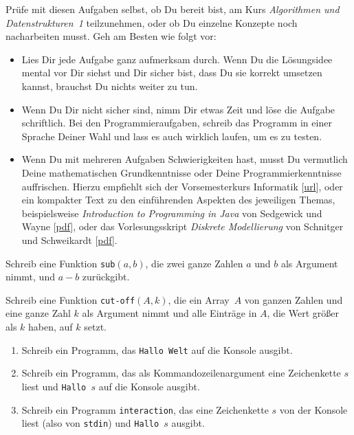 \documentclass{uebung_cs}
\begin{document}
Prüfe mit diesen Aufgaben selbst, ob Du bereit bist, am Kurs \emph{Algorithmen und Datenstrukturen~1} teilzunehmen, oder ob Du einzelne Konzepte noch nacharbeiten musst.
Geh am Besten wie folgt vor:
\begin{itemize}
    \item Lies Dir jede Aufgabe ganz aufmerksam durch. Wenn Du die Lösungsidee mental vor Dir siehst und Dir sicher bist, dass Du sie korrekt umsetzen kannst, brauchst Du nichts weiter zu tun.
    \item Wenn Du Dir nicht sicher sind, nimm Dir etwas Zeit und löse die Aufgabe schriftlich. Bei den Programmieraufgaben, schreib das Programm in einer Sprache Deiner Wahl und lass es auch wirklich laufen, um es zu testen.
    \item Wenn Du mit mehreren Aufgaben Schwierigkeiten hast, musst Du vermutlich Deine mathematischen Grundkenntnisse oder Deine Programmierkenntnisse auffrischen. Hierzu empfiehlt sich der Vorsemesterkurs Informatik [\href{http://www-stud.informatik.uni-frankfurt.de/~lz_inf/Vorkurs/WS2021/webseite.html}{url}], oder ein kompakter Text zu den einführenden Aspekten des jeweiligen Themas, beispielsweise \emph{Introduction to Programming in Java} von Sedgewick und Wayne [\href{https://introcs.cs.princeton.edu/java/home/chapter1.pdf}{pdf}], oder das Vorlesungsskript \emph{Diskrete Modellierung} von Schnitger und Schweikardt [\href{http://algo.cs.uni-frankfurt.de/lehre/dismod/material/skript1920.pdf}{pdf}].
\end{itemize}

\begin{aufgabe}[Subtraktion]
    Schreib eine Funktion \texttt{sub}$(a,b)$, die zwei ganze Zahlen $a$ und $b$ als Argument nimmt, und $a-b$ zurückgibt.
\end{aufgabe}

\begin{aufgabe}
    Schreib eine Funktion \texttt{cut-off}$(A,k)$, die ein Array~$A$ von ganzen Zahlen und eine ganze Zahl $k$ als Argument nimmt und alle Einträge in $A$, die Wert größer als $k$ haben, auf $k$ setzt.
\end{aufgabe}

\begin{aufgabe}\mbox{}
    \begin{enumerate}
        \item Schreib ein Programm, das \texttt{Hallo Welt} auf die Konsole ausgibt.
        \item Schreib ein Programm, das als Kommandozeilenargument eine Zeichenkette $s$ liest und \texttt{Hallo $s$} auf die Konsole ausgibt.
        \item Schreib ein Programm \texttt{interaction}, das eine Zeichenkette $s$ von der Konsole liest (also von \texttt{stdin}) und \texttt{Hallo $s$} ausgibt.
    \end{enumerate}
\end{aufgabe}
\end{document}
